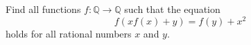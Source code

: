 Find all functions $f:\mathbb{Q}\to\mathbb{Q}$ such that the equation
\[f(xf(x)+y) = f(y) + x^2\]holds for all rational numbers $x$ and $y$.
